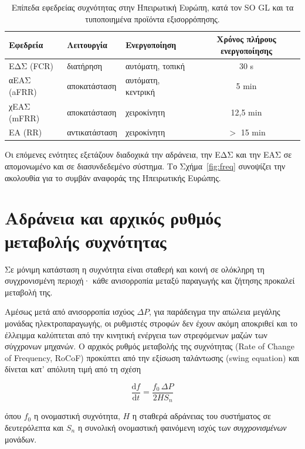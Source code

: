 \begin{table}[!htbp]
\centering
\begin{tabular}{lllc}
\hline
Εφεδρεία & Λειτουργία & Ενεργοποίηση & Χρόνος πλήρους ενεργοποίησης \\
\hline
ΕΔΣ (FCR)   & διατήρηση      & αυτόματη, τοπική   & 30 s \\
αΕΑΣ (aFRR) & αποκατάσταση   & αυτόματη, κεντρική & 5 min \\
χΕΑΣ (mFRR) & αποκατάσταση   & χειροκίνητη        & 12,5 min \\
ΕΑ (RR)     & αντικατάσταση  & χειροκίνητη        & $>$ 15 min \\
\hline
\end{tabular}
\caption{Επίπεδα εφεδρείας συχνότητας στην Ηπειρωτική Ευρώπη, κατά τον SO GL και τα
τυποποιημένα προϊόντα εξισορρόπησης.}
\label{tab:reserves}
\end{table}

Οι επόμενες ενότητες εξετάζουν διαδοχικά την αδράνεια, την ΕΔΣ και την ΕΑΣ σε απομονωμένο
και σε διασυνδεδεμένο σύστημα. Το Σχήμα~\ref{fig:freq} συνοψίζει την ακολουθία για το συμβάν
αναφοράς της Ηπειρωτικής Ευρώπης.

\section{Αδράνεια και αρχικός ρυθμός μεταβολής συχνότητας}

Σε μόνιμη κατάσταση η συχνότητα είναι σταθερή και κοινή σε ολόκληρη τη συγχρονισμένη
περιοχή· κάθε ανισορροπία μεταξύ παραγωγής και ζήτησης προκαλεί μεταβολή της.

Αμέσως μετά από ανισορροπία ισχύος $\Delta P$, για παράδειγμα την απώλεια μεγάλης μονάδας
ηλεκτροπαραγωγής, οι ρυθμιστές στροφών δεν έχουν ακόμη αποκριθεί και το έλλειμμα καλύπτεται
από την κινητική ενέργεια των στρεφόμενων μαζών των σύγχρονων μηχανών. Ο αρχικός ρυθμός
μεταβολής της συχνότητας (Rate of Change of Frequency, RoCoF) προκύπτει από την εξίσωση
ταλάντωσης (swing equation) και δίνεται κατ' απόλυτη τιμή από τη σχέση

\begin{equation}
\frac{\mathrm{d}f}{\mathrm{d}t} = \frac{f_0 \, \Delta P}{2 H S_n}
\label{eq:rocof}
\end{equation}

όπου $f_0$ η ονομαστική συχνότητα, $H$ η σταθερά αδράνειας του συστήματος σε δευτερόλεπτα
και $S_n$ η συνολική ονομαστική φαινόμενη ισχύς των \emph{συγχρονισμένων} μονάδων.

